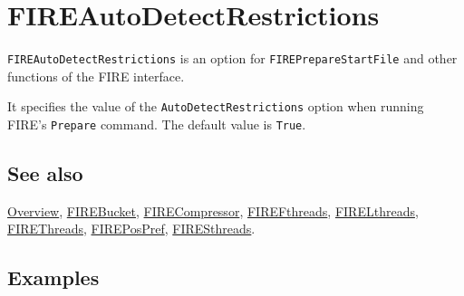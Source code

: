 \documentclass[../FeynHelpersManual.tex]{subfiles}
\begin{document}
\begin{Shaded}
\begin{Highlighting}[]
 
\end{Highlighting}
\end{Shaded}

\hypertarget{fireautodetectrestrictions}{
\section{FIREAutoDetectRestrictions}\label{fireautodetectrestrictions}}

\texttt{FIREAutoDetectRestrictions} is an option for
\texttt{FIREPrepareStartFile} and other functions of the FIRE interface.

It specifies the value of the \texttt{AutoDetectRestrictions} option
when running FIRE's \texttt{Prepare} command. The default value is
\texttt{True}.

\subsection{See also}

\hyperlink{toc}{Overview}, \hyperlink{firebucket}{FIREBucket},
\hyperlink{firecompressor}{FIRECompressor},
\hyperlink{firefthreads}{FIREFthreads},
\hyperlink{firelthreads}{FIRELthreads},
\hyperlink{firethreads}{FIREThreads},
\hyperlink{firepospref}{FIREPosPref},
\hyperlink{firesthreads}{FIRESthreads}.

\subsection{Examples}
\end{document}
